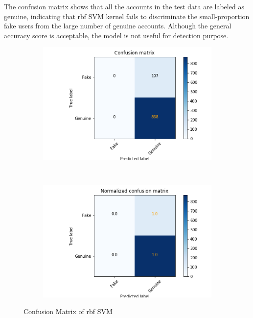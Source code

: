 \documentclass[a4paper, 12pt]{report}
\begin{document}
\noindent The confusion matrix shows that all the accounts in the test data are labeled as genuine, indicating that rbf SVM kernel fails to discriminate the small-proportion fake users from the large number of genuine accounts. Although the general accuracy score is acceptable, the model is not useful for detection purpose.
\begin{figure}[h!]
	\centering
	\begin{subfigure}[c]{0.45\linewidth}
		\includegraphics[width =\linewidth]{rbf_svc_confm_11.png}
	\end{subfigure}
	~
	\begin{subfigure}[c]{0.45\linewidth}
		\includegraphics[width =\linewidth]{rbf_svc_confm_12.png}
	\end{subfigure}
	\caption{Confusion Matrix of rbf SVM}
\end{figure}
\end{document}
